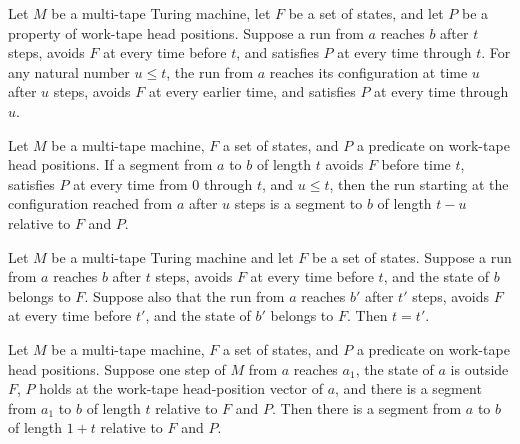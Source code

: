 \begin{theorem}
\label{Turing.Segment.take}
\leanok
{}
Let $M$ be a multi-tape Turing machine, let $F$ be a set of states, and let $P$ be a
property of work-tape head positions. Suppose a run from $a$ reaches $b$ after $t$
steps, avoids $F$ at every time before $t$, and satisfies $P$ at every time through $t$.
For any natural number $u\le t$, the run from $a$ reaches its configuration at time $u$
after $u$ steps, avoids $F$ at every earlier time, and satisfies $P$ at every time
through $u$.
\end{theorem}

\begin{theorem}
\label{Turing.Segment.drop}
\leanok
{}
Let $M$ be a multi-tape machine, $F$ a set of states, and $P$ a predicate on work-tape
head positions. If a segment from $a$ to $b$ of length $t$ avoids $F$ before time $t$,
satisfies $P$ at every time from $0$ through $t$, and $u\le t$, then the run starting at
the configuration reached from $a$ after $u$ steps is a segment to $b$ of length $t-u$
relative to $F$ and $P$.
\end{theorem}

\begin{theorem}
\label{Turing.Segment.time_eq}
\leanok
{}
Let $M$ be a multi-tape Turing machine and let $F$ be a set of states. Suppose a run
from $a$ reaches $b$ after $t$ steps, avoids $F$ at every time before $t$, and the state
of $b$ belongs to $F$. Suppose also that the run from $a$ reaches $b'$ after $t'$ steps,
avoids $F$ at every time before $t'$, and the state of $b'$ belongs to $F$. Then $t=t'$.
\end{theorem}

\begin{theorem}
\label{Turing.Segment.cons}
\leanok
{}
Let $M$ be a multi-tape machine, $F$ a set of states, and $P$ a predicate on work-tape
head positions. Suppose one step of $M$ from $a$ reaches $a_1$, the state of $a$ is
outside $F$, $P$ holds at the work-tape head-position vector of $a$, and there is a
segment from $a_1$ to $b$ of length $t$ relative to $F$ and $P$. Then there is a segment
from $a$ to $b$ of length $1+t$ relative to $F$ and $P$.
\end{theorem}

